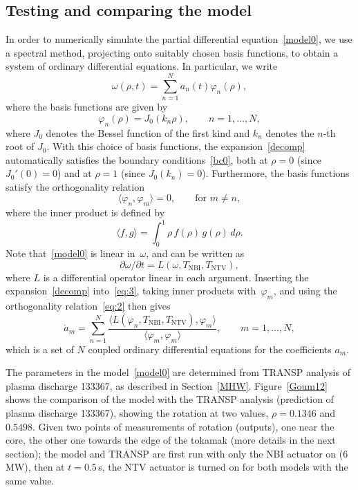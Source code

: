 \documentclass{iopart}
\begin{document}
\subsection{Testing and comparing the model}
\label{sec:test-comp-model}
In order to numerically simulate the partial differential equation~\eqref{model0}, we use a spectral method, projecting onto suitably chosen basis functions, to obtain a system of ordinary differential equations.  In particular, we write
\begin{equation}
\omega(\rho,t)  = \sum_{n=1}^{N} a_n(t) \varphi_n(\rho),
\label{decomp}
\end{equation}
where the basis functions are given by
\begin{equation}
  \label{eq:1}
  \varphi_n(\rho) = J_0(k_n\rho),\qquad n=1,\ldots,N,
\end{equation}
where $J_0$ denotes the Bessel function of the first kind and $k_n$ denotes the $n$-th root of $J_0$.  With this choice of basis functions, the expansion~\eqref{decomp} automatically satisfies the boundary conditions~\eqref{bc0}, both at $\rho=0$ (since $J_0'(0)=0$) and at $\rho=1$ (since $J_0(k_n)=0$).  Furthermore, the basis functions satisfy the orthogonality relation
\begin{equation}
  \label{eq:2}
  \langle \varphi_n,\varphi_m\rangle = 0,\qquad \text{for $m\ne n$},
\end{equation}
where the inner product is defined by
\begin{equation*}
\langle f,g \rangle =   \int^1 _0 \rho \, f(\rho) \, g(\rho) \, d\rho.
\end{equation*}
Note that~\eqref{model0} is linear in~$\omega$, and can be written as
\begin{equation}
\label{eq:3}
\partial \omega/\partial t=L(\omega,T_\text{NBI},T_\text{NTV}),
\end{equation}
where $L$ is a differential operator linear in each argument.  Inserting the expansion~\eqref{decomp} into~\eqref{eq:3}, taking inner products with~$\varphi_m$, and using the orthogonality relation~\eqref{eq:2} then gives
\begin{equation*}
  \dot a_m = \sum_{n=1}^N \frac{\langle L(\varphi_n, T_\text{NBI}, T_\text{NTV}),
    \varphi_m\rangle}{\langle \varphi_m,\varphi_m\rangle},\qquad m=1,\ldots,N,
\end{equation*}
which is a set of $N$ coupled ordinary differential equations for the coefficients $a_m$.

The parameters in the model~\eqref{model0} are determined from TRANSP analysis of plasma discharge 133367, as described in Section~\ref{MHW}.  Figure~\ref{Goum12} shows the comparison of the model with the TRANSP analysis (prediction of plasma discharge 133367), showing the rotation at two values, $\rho=0.1346$ and $0.5498$.
%
Given two points of measurements of rotation (outputs), one near the core, the other one towards the edge of the tokamak (more details in the next section); the model and TRANSP are first run with only the NBI actuator on ($6$\,MW), then at $t=0.5$\,s, the NTV actuator is turned on for both models with the same value. 
\end{document}
